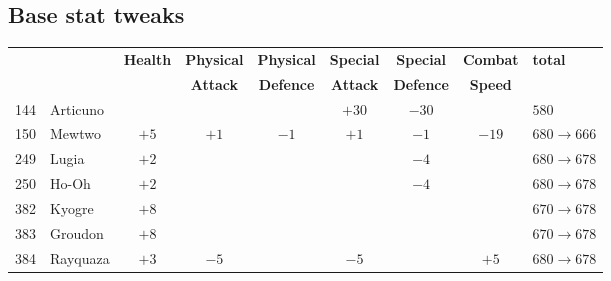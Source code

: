 \documentclass{article}
\begin{document}
\subsection{Base stat tweaks}
\small
\begin{longtable}{rl|cccccc|l}
 &  & \textbf{Health} & \textbf{Physical} & \textbf{Physical} & \textbf{Special} & \textbf{Special} & \textbf{Combat} & \textbf{total} \\
 &  &  & \textbf{Attack} & \textbf{Defence} & \textbf{Attack} & \textbf{Defence} & \textbf{Speed} &  \\
\hline
144 & Articuno &  &  &  & $+30$ & $-30$ &  & $580$ \\
150 & Mewtwo & $+5$ & $+1$ & $-1$ & $+1$ & $-1$ & $-19$ & $680 \rightarrow 666$ \\
\hline %
249 & Lugia & $+2$ &  &  &  & $-4$ &  & $680 \rightarrow 678$ \\
250 & Ho-Oh & $+2$ &  &  &  & $-4$ &  & $680 \rightarrow 678$ \\
\hline %
382 & Kyogre & $+8$ &  &  &  &  &  & $670 \rightarrow 678$ \\
383 & Groudon & $+8$ &  &  &  &  &  & $670 \rightarrow 678$ \\
384 & Rayquaza & $+3$ & $-5$ &  & $-5$ &  & $+5$ & $680 \rightarrow 678$ \\

\end{longtable}
\end{document}

